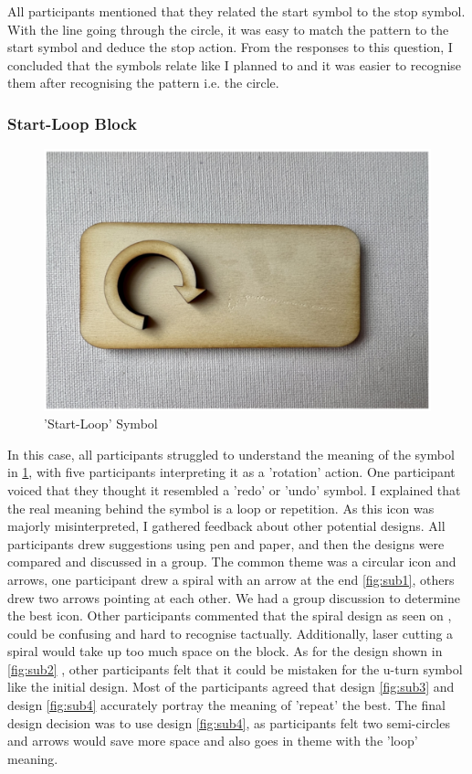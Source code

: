 \documentclass[oneside,%
                    author={Malak Hajji},
                    degree={BSc},
                    title={Designing An Accessible Computational Toolkit For Students},
                  subtitle={With Mixed Visual Abilities}]{dissertation}
\begin{document}
All participants mentioned that they related the start symbol to the stop symbol. With the line going through the circle, it was easy to match the pattern to the start symbol and deduce the stop action. From the responses to this question, I concluded that the symbols relate like I planned to and it was easier to recognise them after recognising the pattern i.e. the circle. 

\subsubsection{Start-Loop Block}

\FloatBarrier
\begin{figure}[h]
    \centering
    \includegraphics[width=\textwidth]{thesis/loopstart.eps}
    \caption{'Start-Loop' Symbol}
    \label{fig-startloop}
\end{figure}
\FloatBarrier
In this case, all participants struggled to understand the meaning of the symbol in \ref{fig-startloop}, with five participants interpreting it as a 'rotation' action. One participant voiced that they thought it resembled a 'redo' or 'undo' symbol. I explained that the real meaning behind the symbol is a loop or repetition. As this icon was majorly misinterpreted, I gathered feedback about other potential designs. All participants drew suggestions using pen and paper, and then the designs were compared and discussed in a group. The common theme was a circular icon and arrows, one participant drew a spiral with an arrow at the end \ref{fig:sub1}, others drew two arrows pointing at each other. We had a group discussion to determine the best icon. Other participants commented that the spiral design as seen on , could be confusing and hard to recognise tactually. Additionally, laser cutting a spiral would take up too much space on the block. As for the design shown in \ref{fig:sub2} , other participants felt that it could be mistaken for the u-turn symbol like the initial design. Most of the participants agreed that design \ref{fig:sub3} and design \ref{fig:sub4} accurately portray the meaning of 'repeat' the best. The final design decision was to use design \ref{fig:sub4}, as participants felt two semi-circles and arrows would save more space and also goes in theme with the 'loop' meaning.
\end{document}
